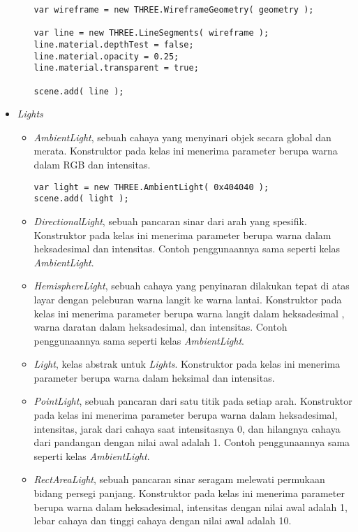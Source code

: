 \begin{itemize}
\begin{itemize}
\begin{lstlisting}[caption={Contoh penggunaan kelas {\it WireframeGeometry}.},captionpos=b]
var wireframe = new THREE.WireframeGeometry( geometry );

var line = new THREE.LineSegments( wireframe );
line.material.depthTest = false;
line.material.opacity = 0.25;
line.material.transparent = true;

scene.add( line );
\end{lstlisting}

	\end{itemize}
	
\item \textit{Lights}

	\begin{itemize}
	\item {\it AmbientLight}, sebuah cahaya yang menyinari objek secara global dan merata. Konstruktor pada kelas ini menerima parameter berupa warna dalam RGB dan intensitas.
	
\begin{lstlisting}[caption={Contoh penggunaan kelas {\it AmbientLight}.},captionpos=b]
var light = new THREE.AmbientLight( 0x404040 ); 
scene.add( light );
\end{lstlisting}
	
	\item {\it DirectionalLight}, sebuah pancaran sinar dari arah yang spesifik. Konstruktor pada kelas ini menerima parameter berupa warna dalam heksadesimal dan intensitas. Contoh penggunaannya sama seperti kelas {\it AmbientLight}.

	\item {\it HemisphereLight}, sebuah cahaya yang penyinaran dilakukan tepat di atas layar dengan peleburan warna langit ke warna lantai. Konstruktor pada kelas ini menerima parameter berupa warna langit dalam heksadesimal , warna daratan dalam heksadesimal, dan intensitas. Contoh penggunaannya sama seperti kelas {\it AmbientLight}.
	
	\item {\it Light}, kelas abstrak untuk {\it Lights}. Konstruktor pada kelas ini menerima parameter berupa warna dalam heksimal dan intensitas.

	\item {\it PointLight}, sebuah pancaran dari satu titik pada setiap arah. Konstruktor pada kelas ini menerima parameter berupa warna dalam heksadesimal, intensitas, jarak dari cahaya saat intensitasnya 0, dan hilangnya cahaya dari pandangan dengan nilai awal adalah 1. Contoh penggunaannya sama seperti kelas {\it AmbientLight}.
	
	\item {\it RectAreaLight}, sebuah pancaran sinar seragam melewati permukaan bidang persegi panjang. Konstruktor pada kelas ini menerima parameter berupa warna dalam heksadesimal, intensitas dengan nilai awal adalah 1, lebar cahaya dan tinggi cahaya dengan nilai awal adalah 10.
	

\end{itemize}
\end{itemize}
